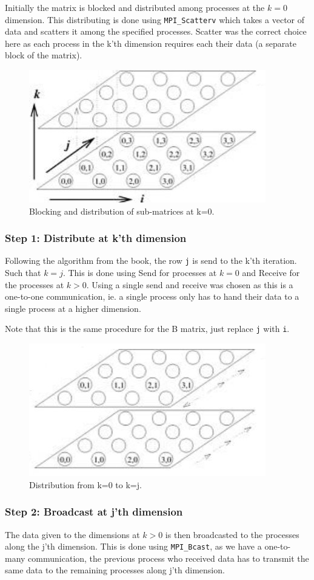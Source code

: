 \documentclass[a4paper,11pt,oneside]{book}
\begin{document}
Initially the matrix is blocked and distributed among processes at the $k=0$ dimension. This distributing is done using \verb!MPI_Scatterv! which takes a vector of data and scatters it among the specified processes. Scatter was the correct choice here as each process in the k'th dimension requires each their data (a separate block of the matrix).

\begin{figure}[H]
  \centering
  \includegraphics[width=0.5\linewidth]{dns1.jpg}
  \caption{Blocking and distribution of sub-matrices at k=0.}
  \centering
  \label{fig:sub1}
\end{figure}

\subsubsection*{Step 1: Distribute at k'th dimension}
Following the algorithm from the book, the row \verb!j! is send to the k'th iteration. Such that $k=j$. This is done using Send for processes at $k=0$ and Receive for the processes at $k>0$. Using a single send and receive was chosen as this is a one-to-one communication, ie. a single process only has to hand their data to a single process at a higher dimension.

Note that this is the same procedure for the B matrix, just replace \verb!j! with \verb!i!.

\begin{figure}[H]
  \centering
  \includegraphics[width=0.5\linewidth]{dns2.jpg}
  \caption{Distribution from k=0 to k=j.}
  \centering
  \label{fig:sub1}
\end{figure}

\subsubsection*{Step 2: Broadcast at j'th dimension}
The data given to the dimensions at $k>0$ is then broadcasted to the processes along the j'th dimension. This is done using \verb!MPI_Bcast!, as we have a one-to-many communication, the previous process who received data has to transmit the same data to the remaining processes along j'th dimension.
\end{document}
